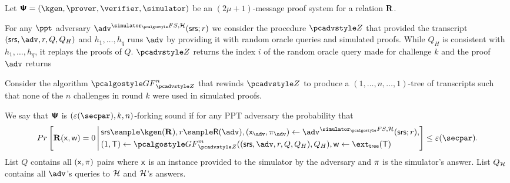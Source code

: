 \documentclass[runningheads,11pt]{llncs}
\begin{document}
\begin{definition}
  Let $\proofsystem = (\kgen, \prover, \verifier, \simulator)$ be an
  $(2 \mu + 1)$-message proof system for a relation $\mathbf{R}$.

For any $\ppt$ adversary $\advse^{\simulator_\fs,
  \ro} (\srs; r)$ we consider the procedure $\zdv$ that provided the transcript $(\srs, \adv, r, Q, Q_{H})$ and $h_1, \ldots, h_q$ runs $\adv$ by providing it with random oracle queries
and simulated proofs. While $Q_{H}$ is consistent with $h_1, \ldots, h_q$, it replays the proofs of $Q$.
%
$\zdv$ returns the index $i$ of the
  random oracle query made for challenge $k$ and the proof $\adv$ returns

  Consider the algorithm $\genforking_{\zdv}^{n}$
  that rewinds $\zdv$ to produce a $(1,\dots, n,\dots, 1)$-tree of
  transcripts such that none of the $n$ challenges in round $k$ were used in
  simulated proofs.

  We say that $\bm{\mathsf{\Psi}}$ is $(\eps(\secpar), k,n)$-forking sound if
  for any PPT adversary the probability that
  \begin{align*}
    Pr\left[
    \REL(\inp, \wit) = 0
    \,\Biggl|\,
    \begin{aligned}
       & \srs \sample \kgen(\REL),
        r \sample \RND{\advse},
         (\inp_{\advse}, \zkproof_{\advse}) \gets \advse^{\simulator_\fs,\ro} (\srs; r), \\
       &    (1, \tree) \gets \genforking_{\zdv}^{m}((\srs,\adv,r,Q, Q_{H}),Q_{H}),
           \wit \gets \extt(\tree)
    \end{aligned}
    \right] \leq \eps(\secpar).
  \end{align*}
   List $Q$ contains all $(\mathsf{x}, \pi)$ pairs where
  $\mathsf{x}$ is an instance provided to the simulator by the adversary and
  $\pi$ is the simulator's answer. List $Q_{\mathcal{H}}$ contains all $\advse$'s
  queries to $\mathcal{H}$ and $\mathcal{H}$'s answers.
\end{definition}
\end{document}
